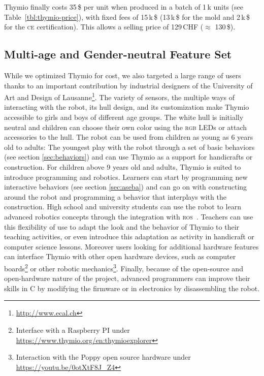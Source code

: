 \documentclass[letterpaper, 10 pt, conference]{ieeeconf}  %
\begin{document}
Thymio finally costs 35\,\$ per unit when produced in a batch of 1\,k units (see Table~\ref{tbl:thymio-price}), with fixed fees of 15\,k\,\$ (13\,k\,\$ for the mold and 2\,k\,\$ for the \textsc{ce} certification).
This allows a selling price of 129\,CHF ($\approx$ 130\,\$).

\subsection{Multi-age and Gender-neutral Feature Set}
\label{sec:multi}

While we optimized Thymio for cost, we also targeted a large range of users thanks to an important contribution by industrial designers of the University of Art and Design of Lausanne\footnote{\url{http://www.ecal.ch}}.
The variety of sensors, the multiple ways of interacting with the robot, its hull design, and its customization make Thymio accessible to girls and boys of different age groups.
The white hull is initially neutral and children can choose their own color using the \textsc{rgb} LEDs or attach accessories to the hull.
The robot can be used from children as young as 6 years old to adults:
The youngest play with the robot through a set of basic behaviors (see section \ref{sec:behaviors}) and can use Thymio as a support for handicrafts or construction.
For children above 9 years old and adults, Thymio is suited to introduce programming and robotics.
Learners can start by programming new interactive behaviors (see section \ref{sec:aseba}) and can go on with constructing around the robot and programming a behavior that interplays with the construction.
High school and university students can use the robot to learn advanced robotics concepts through the integration with \textsc{ros}~\cite{quigley2009ros}.
Teachers can use this flexibility of use to adapt the look and the behavior of Thymio to their teaching activities, or even introduce this adaptation as activity in handicraft or computer science lessons.
Moreover users looking for additional hardware features can interface Thymio with other open hardware devices, such as computer boards\footnote{Interface with a Raspberry PI under \url{https://www.thymio.org/en:thymioexplorer}} or other robotic mechanics\footnote{Interaction with the Poppy open source hardware under \url{https://youtu.be/0otXtF8J_Z4}}.
Finally, because of the open-source and open-hardware nature of the project, advanced programmers can improve their skills in C by modifying the firmware or in electronics by disassembling the robot.
\end{document}
